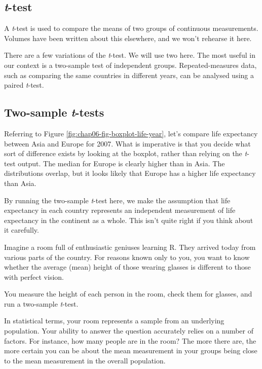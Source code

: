 \documentclass[
  12pt,
  krantz2]{krantz}
\begin{document}
\hypertarget{t-test}{%
\subsection{\texorpdfstring{\emph{t}-test}{t-test}}\label{t-test}}

A \emph{t}-test is used to compare the means of two groups of continuous measurements.
Volumes have been written about this elsewhere, and we won't rehearse it here.

There are a few variations of the \emph{t}-test.
We will use two here.
The most useful in our context is a two-sample test of independent groups.
Repeated-measures data, such as comparing the same countries in different years, can be analysed using a paired \emph{t}-test.

\hypertarget{two-sample-t-tests}{%
\subsection{\texorpdfstring{Two-sample \emph{t}-tests}{Two-sample t-tests}}\label{two-sample-t-tests}}


Referring to Figure \ref{fig:chap06-fig-boxplot-life-year}, let's compare life expectancy between Asia and Europe for 2007.
What is imperative is that you decide what sort of difference exists by looking at the boxplot, rather than relying on the \emph{t}-test output.
The median for Europe is clearly higher than in Asia.
The distributions overlap, but it looks likely that Europe has a higher life expectancy than Asia.

By running the two-sample \emph{t}-test here, we make the assumption that life expectancy in each country represents an independent measurement of life expectancy in the continent as a whole.
This isn't quite right if you think about it carefully.

Imagine a room full of enthusiastic geniuses learning R.
They arrived today from various parts of the country.
For reasons known only to you, you want to know whether the average (mean) height of those wearing glasses is different to those with perfect vision.

You measure the height of each person in the room, check them for glasses, and run a two-sample \emph{t}-test.

In statistical terms, your room represents a sample from an underlying population.
Your ability to answer the question accurately relies on a number of factors.
For instance, how many people are in the room?
The more there are, the more certain you can be about the mean measurement in your groups being close to the mean measurement in the overall population.
\end{document}
